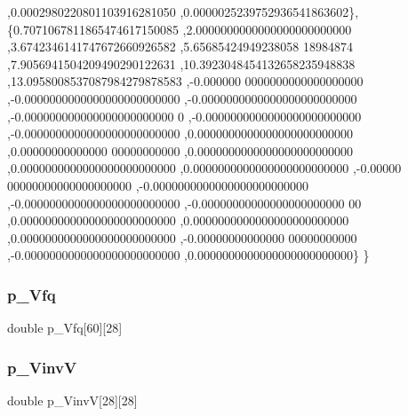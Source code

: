 \begin{DoxyCode}
      ,0.0002980220801103916281050 ,0.0000025239752936541863602\},
\{0.7071067811865474617150085 ,2.0000000000000000000000000 ,3.6742346141747672660926582 ,5.65685424949238058
      18984874 ,7.9056941504209490290122631 ,10.3923048454132658235948838 ,13.0958008537087984279878583 ,-0.000000
      0000000000000000000 ,-0.0000000000000000000000000 ,-0.0000000000000000000000000 ,-0.000000000000000000000000
      0 ,-0.0000000000000000000000000 ,-0.0000000000000000000000000 ,0.0000000000000000000000000 ,0.00000000000000
      00000000000 ,0.0000000000000000000000000 ,0.0000000000000000000000000 ,0.0000000000000000000000000 ,-0.00000
      00000000000000000000 ,-0.0000000000000000000000000 ,-0.0000000000000000000000000 ,-0.00000000000000000000000
      00 ,0.0000000000000000000000000 ,0.0000000000000000000000000 ,0.0000000000000000000000000 ,-0.00000000000000
      00000000000 ,-0.0000000000000000000000000 ,0.0000000000000000000000000\}
\}
\end{DoxyCode}
\mbox{\label{a00461_a0c4bfd31f74aaa8bf67863f17ac58de3}} 
\subsubsection{\texorpdfstring{p\+\_\+\+Vfq}{p\_Vfq}}
{\footnotesize\ttfamily double p\+\_\+\+Vfq\mbox{[}60\mbox{]}\mbox{[}28\mbox{]}}

\mbox{\label{a00461_a317c2a41984fddb8c19eb2ee99e8fea5}} 
\subsubsection{\texorpdfstring{p\+\_\+\+VinvV}{p\_VinvV}}
{\footnotesize\ttfamily double p\+\_\+\+VinvV\mbox{[}28\mbox{]}\mbox{[}28\mbox{]}}

